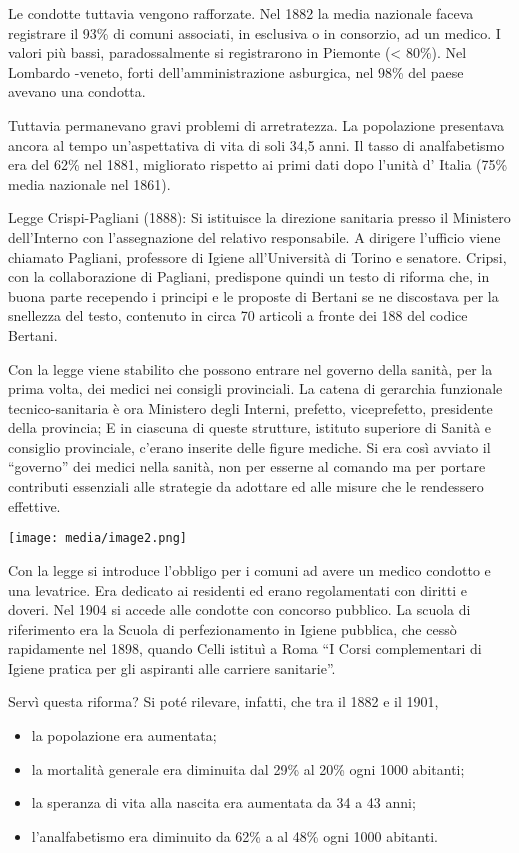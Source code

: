 \documentclass[]{article}
\begin{document}
Le condotte tuttavia vengono rafforzate. Nel 1882 la media nazionale
faceva registrare il 93\% di comuni associati, in esclusiva o in
consorzio, ad un medico. I valori più bassi, paradossalmente si
registrarono in Piemonte (\textless{} 80\%). Nel Lombardo -veneto, forti
dell'amministrazione asburgica, nel 98\% del paese avevano una condotta.

Tuttavia permanevano gravi problemi di arretratezza. La popolazione
presentava ancora al tempo un'aspettativa di vita di soli 34,5 anni. Il
tasso di analfabetismo era del 62\% nel 1881, migliorato rispetto ai
primi dati dopo l'unità d' Italia (75\% media nazionale nel 1861).

Legge Crispi-Pagliani (1888): Si istituisce la direzione sanitaria
presso il Ministero dell'Interno con l'assegnazione del relativo
responsabile. A dirigere l'ufficio viene chiamato Pagliani, professore
di Igiene all'Università di Torino e senatore. Cripsi, con la
collaborazione di Pagliani, predispone quindi un testo di riforma che,
in buona parte recependo i principi e le proposte di Bertani se ne
discostava per la snellezza del testo, contenuto in circa 70 articoli a
fronte dei 188 del codice Bertani.

Con la legge viene stabilito che possono entrare nel governo della
sanità, per la prima volta, dei medici nei consigli provinciali. La
catena di gerarchia funzionale tecnico-sanitaria è ora Ministero degli
Interni, prefetto, viceprefetto, presidente della provincia; E in
ciascuna di queste strutture, istituto superiore di Sanità e consiglio
provinciale, c'erano inserite delle figure mediche. Si era così avviato
il ``governo'' dei medici nella sanità, non per esserne al comando ma
per portare contributi essenziali alle strategie da adottare ed alle
misure che le rendessero effettive.

\texttt{[image: media/image2.png]}

Con la legge si introduce l'obbligo per i comuni ad avere un medico
condotto e una levatrice. Era dedicato ai residenti ed erano
regolamentati con diritti e doveri. Nel 1904 si accede alle condotte con
concorso pubblico. La scuola di riferimento era la Scuola di
perfezionamento in Igiene pubblica, che cessò rapidamente nel 1898,
quando Celli istituì a Roma ``I Corsi complementari di Igiene pratica
per gli aspiranti alle carriere sanitarie''.

Servì questa riforma? Si poté rilevare, infatti, che tra il 1882 e il
1901,

\begin{itemize}
\item
  la popolazione era aumentata;
\item
  la mortalità generale era diminuita dal 29\% al 20\% ogni 1000
  abitanti;
\item
  la speranza di vita alla nascita era aumentata da 34 a 43 anni;
\item
  l'analfabetismo era diminuito da 62\% a al 48\% ogni 1000 abitanti.
\end{itemize}
\end{document}
